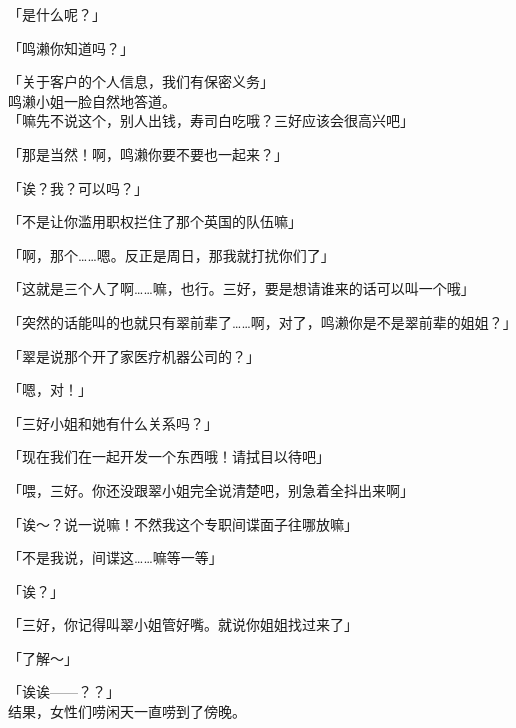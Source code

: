 「是什么呢？」

「鸣濑你知道吗？」

「关于客户的个人信息，我们有保密义务」\\

鸣濑小姐一脸自然地答道。\\

「嘛先不说这个，别人出钱，寿司白吃哦？三好应该会很高兴吧」

「那是当然！啊，鸣濑你要不要也一起来？」

「诶？我？可以吗？」

「不是让你滥用职权拦住了那个英国的队伍嘛」

「啊，那个……嗯。反正是周日，那我就打扰你们了」

「这就是三个人了啊……嘛，也行。三好，要是想请谁来的话可以叫一个哦」

「突然的话能叫的也就只有翠前辈了……啊，对了，鸣濑你是不是翠前辈的姐姐？」

「翠是说那个开了家医疗机器公司的？」

「嗯，对！」

「三好小姐和她有什么关系吗？」

「现在我们在一起开发一个东西哦！请拭目以待吧」

「喂，三好。你还没跟翠小姐完全说清楚吧，别急着全抖出来啊」

「诶～？说一说嘛！不然我这个专职间谍面子往哪放嘛」

「不是我说，间谍这……嘛等一等」

「诶？」

「三好，你记得叫翠小姐管好嘴。就说你姐姐找过来了」

「了解～」

「诶诶——？？」\\

结果，女性们唠闲天一直唠到了傍晚。\\

